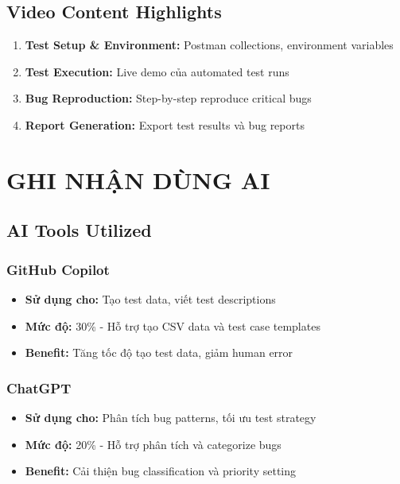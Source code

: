 \documentclass[12pt,a4paper]{article}
\begin{document}
  \subsection{Video Content Highlights}

  \begin{enumerate}
  \item \textbf{Test Setup \& Environment:} Postman collections, environment variables
  \item \textbf{Test Execution:} Live demo của automated test runs
  \item \textbf{Bug Reproduction:} Step-by-step reproduce critical bugs
  \item \textbf{Report Generation:} Export test results và bug reports
  \end{enumerate}

  \section{GHI NHẬN DÙNG AI}

  \subsection{AI Tools Utilized}

  \subsubsection{GitHub Copilot}
  \begin{itemize}
  \item \textbf{Sử dụng cho:} Tạo test data, viết test descriptions
  \item \textbf{Mức độ:} 30\% - Hỗ trợ tạo CSV data và test case templates
  \item \textbf{Benefit:} Tăng tốc độ tạo test data, giảm human error
  \end{itemize}

  \subsubsection{ChatGPT}
  \begin{itemize}
  \item \textbf{Sử dụng cho:} Phân tích bug patterns, tối ưu test strategy
  \item \textbf{Mức độ:} 20\% - Hỗ trợ phân tích và categorize bugs
  \item \textbf{Benefit:} Cải thiện bug classification và priority setting
  \end{itemize}
\end{document}
